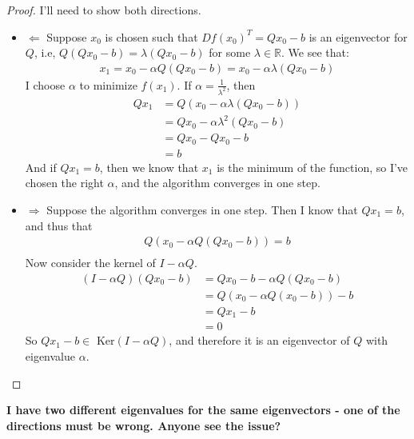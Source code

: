 \documentclass[12pt]{article}
\newenvironment{problem}[2][Problem]{\begin{trivlist}
\item[\hskip \labelsep {\bfseries #1}\hskip \labelsep {\bfseries #2.}]}{\end{trivlist}}
\theoremstyle{definition}
\theoremstyle{definition}
\theoremstyle{definition}
\theoremstyle{definition}
\begin{document}
\begin{problem}{9.4}
\begin{proof}
I'll need to show both directions.
\begin{itemize}
\item $\Leftarrow$ Suppose $x_0$ is chosen such that $Df(x_0)^T = Qx_0 - b$ is an eigenvector for $Q$, i.e, $Q(Qx_0-b) = \lambda (Qx_0-b)$ for some $\lambda \in \mathbb{R}$. We see that: 
\begin{align*}
x_1 = x_0 - \alpha Q(Qx_0 - b) = x_0 - \alpha \lambda (Qx_0 - b)
\end{align*}
I choose $\alpha$ to minimize $f(x_1)$. If $\alpha = \frac{1}{\lambda^2}$, then 
\begin{align*}
Qx_1 &= Q(x_0 - \alpha \lambda (Qx_0 - b)) \\ 
&= Qx_0 - \alpha\lambda^2(Qx_0 - b) \\
&= Qx_0 - Qx_0 - b\\
&= b
\end{align*}
And if $Qx_1 = b$, then we know that $x_1$ is the minimum of the function, so I've chosen the right $\alpha$, and the algorithm converges in one step.
\item $\Rightarrow$
Suppose the algorithm converges in one step. Then I know that $Qx_1 = b$, and thus that 
\begin{align*}
Q(x_0 - \alpha Q(Qx_0-b)) = b \\
\end{align*}
Now consider the kernel of $I - \alpha Q$.
\begin{align*}
(I- \alpha Q)(Qx_0 - b) &= Qx_0 - b - \alpha Q(Qx_0 - b) \\
&= Q(x_0 - \alpha Q(x_0-b)) - b \\
&= Qx_1 - b \\
&= 0
\end{align*}
So $Qx_1 - b \in$ Ker$(I- \alpha Q)$, and therefore it is an eigenvector of $Q$ with eigenvalue $\alpha$. \\
\end{itemize}
\end{proof} 
\textbf{I have two different eigenvalues for the same eigenvectors - one of the directions must be wrong. Anyone see the issue?}
\end{problem}
\end{document}
